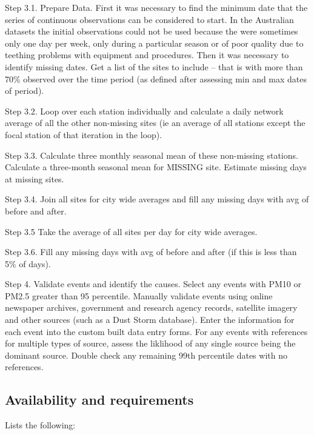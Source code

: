 Step 3.1. Prepare Data. First it was necessary to find the minimum date
that the series of continuous observations can be considered to start.
In the Australian datasets the initial observations could not be used
because the were sometimes only one day per week, only during a
particular season or of poor quality due to teething problems with
equipment and procedures. Then it was necessary to identify missing
dates. Get a list of the sites to include -- that is with more than 70\%
observed over the time period (as defined after assessing min and max
dates of period).

Step 3.2. Loop over each station individually and calculate a daily
network average of all the other non-missing sites (ie an average of all
stations except the focal station of that iteration in the loop).

Step 3.3. Calculate three monthly seasonal mean of these non-missing
stations. Calculate a three-month seasonal mean for MISSING site.
Estimate missing days at missing sites.

Step 3.4. Join all sites for city wide averages and fill any missing
days with avg of before and after.

Step 3.5 Take the average of all sites per day for city wide averages.

Step 3.6. Fill any missing days with avg of before and after (if this is
less than 5\% of days).

Step 4. Validate events and identify the causes. Select any events with
PM10 or PM2.5 greater than 95 percentile. Manually validate events using
online newspaper archives, government and research agency records,
satellite imagery and other sources (such as a Dust Storm database).
Enter the information for each event into the custom built data entry
forms. For any events with references for multiple types of source,
assess the liklihood of any single source being the dominant source.
Double check any remaining 99th percentile dates with no references.

\subsection{Availability and
requirements}\label{availability-and-requirements}

Lists the following:

